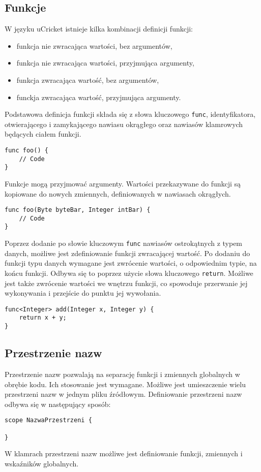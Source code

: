 \subsection{Funkcje}
W języku uCricket istnieje kilka kombinacji  definicji funkcji:
\begin{itemize}
\item funkcja nie zwracająca wartości, bez argumentów,
\item funkcja nie zwracająca wartości, przyjmująca argumenty,
\item funkcja zwracająca wartość, bez argumentów,
\item funckja zwracająca wartość, przyjmująca argumenty. 
\end{itemize}

Podstawowa definicja funkcji składa się z słowa kluczowego \lstinline|func|, identyfikatora, otwierającego i zamykającego nawiasu okrągłego oraz nawiasów klamrowych będących ciałem funkcji.
\begin{lstlisting}
func foo() {
	// Code
}
\end{lstlisting}

Funkcje mogą przyjmować argumenty. Wartości przekazywane do funkcji są kopiowane do nowych zmiennych, definiowanych w nawiasach okrągłych.
\begin{lstlisting}
func foo(Byte byteBar, Integer intBar) {
	// Code
}
\end{lstlisting}

Poprzez dodanie po słowie kluczowym \lstinline|func| nawiasów ostrokątnych z typem danych, możliwe jest zdefiniowanie funkcji zwracającej wartość. Po dodaniu do funkcji typu danych wymagane jest zwrócenie wartości, o odpowiednim typie, na końcu funkcji. Odbywa się to poprzez użycie słowa kluczowego \lstinline|return|. Możliwe jest także zwrócenie wartości we wnętrzu funkcji, co spowoduje przerwanie jej wykonywania i przejście do punktu jej wywołania.
\begin{lstlisting}
func<Integer> add(Integer x, Integer y) {
	return x + y;
}
\end{lstlisting}
\subsection{Przestrzenie nazw}
Przestrzenie nazw pozwalają na separację funkcji i zmiennych globalnych w obrębie kodu. Ich stosowanie jest wymagane. Możliwe jest umieszczenie wielu przestrzeni nazw w jednym pliku źródłowym. Definiowanie przestrzeni nazw odbywa się w następujący sposób:
\begin{lstlisting}
scope NazwaPrzestrzeni {

}
\end{lstlisting}
W klamrach przestrzeni nazw możliwe jest definiowanie funkcji, zmiennych i wskaźników globalnych. 

